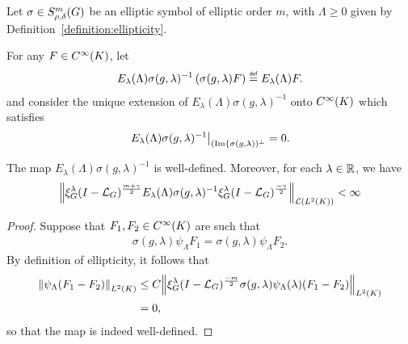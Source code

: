 \begin{lemma}
\label{lemma:inverse_of_elliptic_symbol}
    Let $\sigma \in \SymbolClass m {\rho, \delta}$ be an elliptic symbol of elliptic order $m$,
    with $\Lambda \geq 0$ given by Definition~\ref{definition:ellipticity}.

    For any $F \in \SmoothFunctions \CompactGroup$,
    let
    \begin{align*}
        E_\lambda(\Lambda) \sigma(g, \lambda)^{-1} \left(\sigma(g, \lambda) F\right) \defeq E_\lambda(\Lambda) F.
    \end{align*}
    and consider the unique extension of $E_\lambda(\Lambda) \sigma(g, \lambda)^{-1}$ onto $\SmoothFunctions \CompactGroup$ which satisfies
    \begin{align*}
        \eval {%
            E_\lambda(\Lambda) \sigma(g, \lambda)^{-1}
            } {(\Image \{\sigma(g, \lambda))^\perp} = 0.
    \end{align*}

    The map $E_\lambda(\Lambda) \sigma(g, \lambda)^{-1}$ is well-defined.
    Moreover,
    for each $\lambda \in \R$,
    we have
    \begin{align*}
        \norm [\Lin {\Lebesgue 2 \CompactGroup}] {%
            \Rep \lambda \BesselPotential {m + \gamma}
            E_\lambda(\Lambda) \sigma(g, \lambda)^{-1}
            \Rep \lambda \BesselPotential {-\gamma}
        }
        < \infty
    \end{align*}
\end{lemma}
\begin{proof}
    Suppose that $F_1, F_2 \in \SmoothFunctions \CompactGroup$ are such that
    \begin{align*}
        \sigma(g, \lambda) \psi_\Lambda F_1
        = \sigma(g, \lambda) \psi_\Lambda F_2.
    \end{align*}
    By definition of ellipticity,
    it follows that
    \begin{align*}
        \norm [\Lebesgue 2 \CompactGroup] {\psi_\Lambda (F_1 - F_2)}
        &\leq C
        \norm [\Lebesgue 2 \CompactGroup] {\Rep \lambda \BesselPotential {-m} \sigma(g, \lambda) \psi_\Lambda(\lambda) (F_1 - F_2)}\\
        &= 0,
    \end{align*}
    so that the map is indeed well-defined.
\end{proof}

